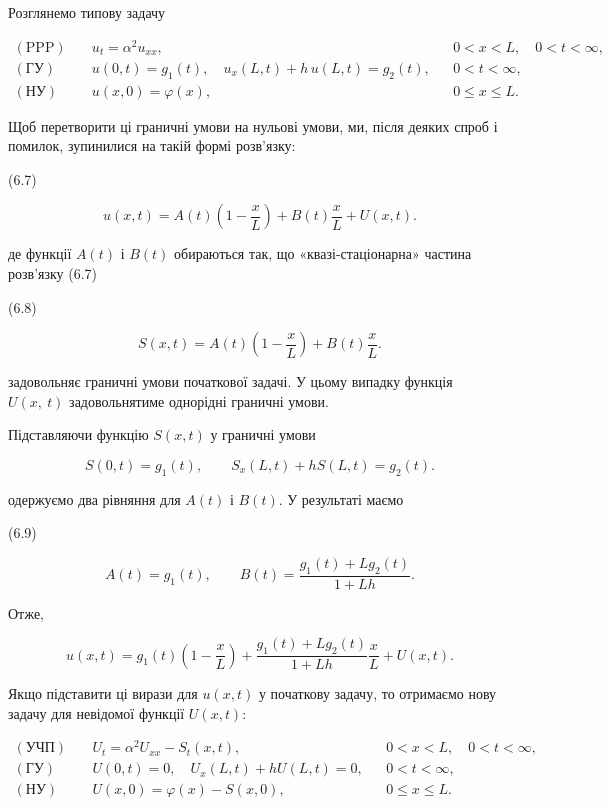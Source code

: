 \documentclass[
  ukrainian,
]{article}
\begin{document}
Розглянемо типову задачу

\[
\begin{aligned}
(\text{PPP})\quad & u_t = \alpha^2 u_{xx}, && 0 < x < L,\quad 0 < t < \infty, \\
(\text{ГУ})\quad & u(0,t)=g_1(t),\quad u_x(L,t)+h\,u(L,t)=g_2(t), && 0 < t < \infty, \\
(\text{НУ})\quad & u(x,0)=\varphi(x), && 0 \le x \le L.
\end{aligned}
\]

Щоб перетворити ці граничні умови на нульові умови, ми, після деяких
спроб і помилок, зупинилися на такій формі розв'язку:

(6.7)

\[
u(x, t)=A(t)\left(1-\frac{x}{L}\right)+B(t)\frac{x}{L}+U(x, t).
\]

де функції \(A\left(t\right)\) і \(B\left(t\right)\) обираються так, що
«квазі-стаціонарна» частина розв'язку (6.7)

(6.8)

\[
S(x, t)=A(t)\left(1-\frac{x}{L}\right)+B(t)\frac{x}{L}.
\]

задовольняє граничні умови початкової задачі. У цьому випадку функція
\(U\left(x,\ t\right)\) задовольнятиме однорідні граничні умови.

Підставляючи функцію \(S(x, t)\) у граничні умови

\[
S(0, t)=g_1(t), \qquad S_x(L, t)+hS(L, t)=g_2(t).
\]

одержуємо два рівняння для \(A(t)\) і \(B(t)\). У результаті маємо

(6.9)

\[
A(t)=g_1(t), \qquad B(t)=\frac{g_1(t)+Lg_2(t)}{1+Lh}.
\]

Отже,

\[
u(x, t)=g_1(t)\left(1-\frac{x}{L}\right)+\frac{g_1(t)+Lg_2(t)}{1+Lh}\frac{x}{L}+U(x, t).
\]

Якщо підставити ці вирази для \(u(x,t)\) у початкову задачу, то
отримаємо нову задачу для невідомої функції \(U(x,t)\):

\[
\begin{aligned}
(\text{УЧП})\quad & U_t = \alpha^2 U_{xx} - S_t(x,t), && 0 < x < L,\quad 0 < t < \infty, \\
(\text{ГУ})\quad & U(0,t) = 0,\quad U_x(L,t) + hU(L,t) = 0, && 0 < t < \infty, \\
(\text{НУ})\quad & U(x,0) = \varphi(x) - S(x,0), && 0 \leqslant x \leqslant L.
\end{aligned}
\]
\end{document}
